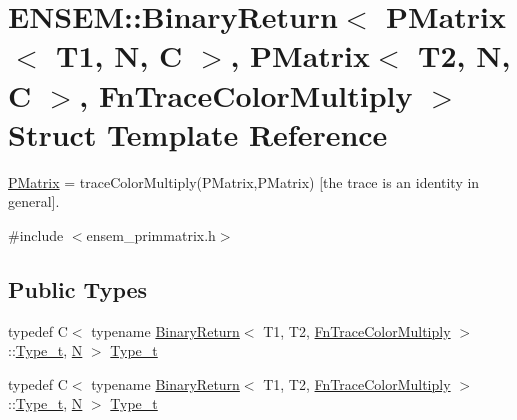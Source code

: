 \hypertarget{structENSEM_1_1BinaryReturn_3_01PMatrix_3_01T1_00_01N_00_01C_01_4_00_01PMatrix_3_01T2_00_01N_00_d90c323b0eef8bf9c5abb3303bff0c7e}{}\section{E\+N\+S\+EM\+:\+:Binary\+Return$<$ P\+Matrix$<$ T1, N, C $>$, P\+Matrix$<$ T2, N, C $>$, Fn\+Trace\+Color\+Multiply $>$ Struct Template Reference}
\label{structENSEM_1_1BinaryReturn_3_01PMatrix_3_01T1_00_01N_00_01C_01_4_00_01PMatrix_3_01T2_00_01N_00_d90c323b0eef8bf9c5abb3303bff0c7e}


\mbox{\hyperlink{classENSEM_1_1PMatrix}{P\+Matrix}} = trace\+Color\+Multiply(\+P\+Matrix,\+P\+Matrix) \mbox{[}the trace is an identity in general\mbox{]}.  




{\ttfamily \#include $<$ensem\+\_\+primmatrix.\+h$>$}

\subsection*{Public Types}
\begin{DoxyCompactItemize}
\item 
typedef C$<$ typename \mbox{\hyperlink{structENSEM_1_1BinaryReturn}{Binary\+Return}}$<$ T1, T2, \mbox{\hyperlink{structENSEM_1_1FnTraceColorMultiply}{Fn\+Trace\+Color\+Multiply}} $>$\+::\mbox{\hyperlink{structENSEM_1_1BinaryReturn_3_01PMatrix_3_01T1_00_01N_00_01C_01_4_00_01PMatrix_3_01T2_00_01N_00_d90c323b0eef8bf9c5abb3303bff0c7e_a1a97d8e27c2d5f37e6e47f449e522310}{Type\+\_\+t}}, \mbox{\hyperlink{operator__name__util_8cc_a7722c8ecbb62d99aee7ce68b1752f337}{N}} $>$ \mbox{\hyperlink{structENSEM_1_1BinaryReturn_3_01PMatrix_3_01T1_00_01N_00_01C_01_4_00_01PMatrix_3_01T2_00_01N_00_d90c323b0eef8bf9c5abb3303bff0c7e_a1a97d8e27c2d5f37e6e47f449e522310}{Type\+\_\+t}}
\item 
typedef C$<$ typename \mbox{\hyperlink{structENSEM_1_1BinaryReturn}{Binary\+Return}}$<$ T1, T2, \mbox{\hyperlink{structENSEM_1_1FnTraceColorMultiply}{Fn\+Trace\+Color\+Multiply}} $>$\+::\mbox{\hyperlink{structENSEM_1_1BinaryReturn_3_01PMatrix_3_01T1_00_01N_00_01C_01_4_00_01PMatrix_3_01T2_00_01N_00_d90c323b0eef8bf9c5abb3303bff0c7e_a1a97d8e27c2d5f37e6e47f449e522310}{Type\+\_\+t}}, \mbox{\hyperlink{operator__name__util_8cc_a7722c8ecbb62d99aee7ce68b1752f337}{N}} $>$ \mbox{\hyperlink{structENSEM_1_1BinaryReturn_3_01PMatrix_3_01T1_00_01N_00_01C_01_4_00_01PMatrix_3_01T2_00_01N_00_d90c323b0eef8bf9c5abb3303bff0c7e_a1a97d8e27c2d5f37e6e47f449e522310}{Type\+\_\+t}}
\end{DoxyCompactItemize}


